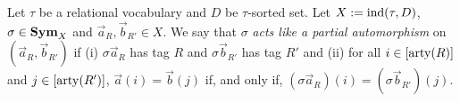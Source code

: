\documentclass[../paper.tex]{subfiles}
\begin{document}





\begin{definition}
  Let $\tau$ be a relational vocabulary and $D$ be $\tau$-sorted set. Let $X :=
  \text{\upshape ind}(\tau, D)$, $\sigma \in \text{\textbf{Sym}}_X$ and $\vec{a}_R, \vec{b}_{R'} \in X$. We
  say that $\sigma$ \emph{acts like a partial automorphism} on $(\vec{a}_R,
  \vec{b}_{R'})$ if (i) $\sigma \vec{a}_R$ has tag $R$ and $\sigma \vec{b}_{R'}$
  has tag $R'$ and (ii) for all $i \in [\mathrm{arty}(R)]$ and $j \in [\mathrm{arty}(R')]$,
  $\vec{a}(i) = \vec{b}(j)$ if, and only if, $(\sigma \vec{a}_R)(i) = (\sigma
  \vec{b}_{R'})(j)$.
\end{definition}
\end{document}
